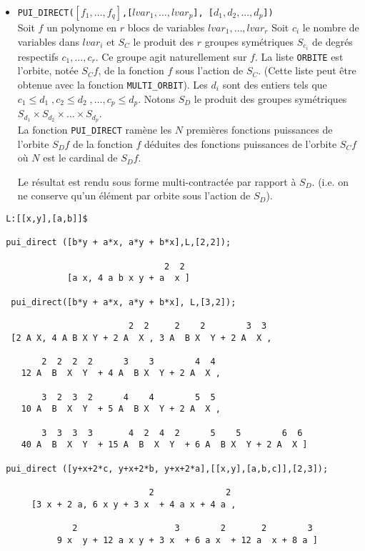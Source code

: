 \documentclass[11pt]{article}
\begin{document}
\normalsize
\begin{itemize}
\item{\tt PUI\_DIRECT($[f_1, \ldots, f_q]$,[$lvar_1,\ldots ,lvar_p$],
[$d_1,d_2,...,d_p$])}\\
 Soit $f$ un polynome en $r$ blocs de variables $lvar_1,\ldots ,lvar_r$
  Soit $c_i$ le nombre de variables dans $lvar_i$  et $S_C$ le produit des $r$
  groupes sym\'etriques $S_{c_i}$ de degr\'es respectifs
  $c_1,...,c_r$. Ce groupe agit
  naturellement sur $f$.
  La liste {\tt ORBITE} est l'orbite, not\'ee $S_Cf$, de la fonction $f$ 
  sous  l'action de $S_C$. (Cette liste peut \^etre obtenue avec la fonction 
  {\tt MULTI\_ORBIT}).
  Les $d_i$ sont des entiers tels que 
  $c_1\leq d_1\;, c_2 \leq d_2 \;,\ldots ,c_p\leq d_p$.
  Notons $S_D$ le produit des groupes sym\'etriques 
$S_{d_1} \times S_{d_2} \times \ldots \times S_{d_p}$.\\

  La fonction {\tt PUI\_DIRECT} ram\`ene les $N$ premi\`eres fonctions 
  puissances de l'orbite $S_Df$ de la fonction $f$
  d\'eduites des fonctions puissances de l'orbite $S_Cf$ o\`u 
  $N$ est le cardinal de $S_Df$.

  Le r\'esultat est rendu sous forme multi-contract\'ee par rapport \`a $S_D$.
 (i.e. on ne conserve qu'un \'el\'ement par orbite sous l'action de $S_D$).
\end{itemize}
\small
\begin{verbatim}
 L:[[x,y],[a,b]]$

 pui_direct ([b*y + a*x, a*y + b*x],L,[2,2]);

                                2  2
             [a x, 4 a b x y + a  x ]

  pui_direct([b*y + a*x, a*y + b*x], L,[3,2]);

                         2  2     2    2        3  3
  [2 A X, 4 A B X Y + 2 A  X , 3 A  B X  Y + 2 A  X ,

        2  2  2  2      3    3        4  4
    12 A  B  X  Y  + 4 A  B X  Y + 2 A  X ,

        3  2  3  2      4    4        5  5
    10 A  B  X  Y  + 5 A  B X  Y + 2 A  X ,

        3  3  3  3       4  2  4  2      5    5        6  6
    40 A  B  X  Y  + 15 A  B  X  Y  + 6 A  B X  Y + 2 A  X ]

 pui_direct ([y+x+2*c, y+x+2*b, y+x+2*a],[[x,y],[a,b,c]],[2,3]);

                             2              2
      [3 x + 2 a, 6 x y + 3 x  + 4 a x + 4 a , 

              2                   3        2       2        3
           9 x  y + 12 a x y + 3 x  + 6 a x  + 12 a  x + 8 a ]


\end{verbatim}
\end{document}
